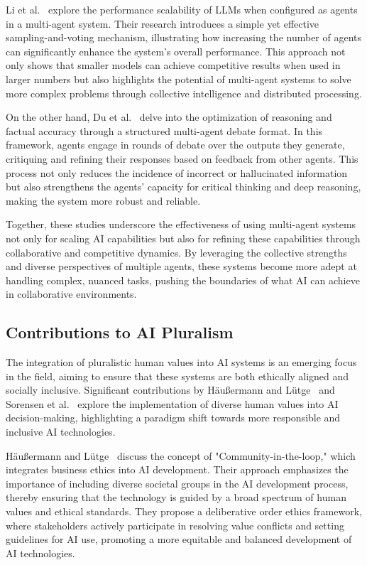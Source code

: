 Li et al.~\cite{li2024agents} explore the performance scalability of LLMs when configured as agents in a multi-agent system. Their research introduces a simple yet effective sampling-and-voting mechanism, illustrating how increasing the number of agents can significantly enhance the system's overall performance. This approach not only shows that smaller models can achieve competitive results when used in larger numbers but also highlights the potential of multi-agent systems to solve more complex problems through collective intelligence and distributed processing.

On the other hand, Du et al.~\cite{du2023improving} delve into the optimization of reasoning and factual accuracy through a structured multi-agent debate format. In this framework, agents engage in rounds of debate over the outputs they generate, critiquing and refining their responses based on feedback from other agents. This process not only reduces the incidence of incorrect or hallucinated information but also strengthens the agents' capacity for critical thinking and deep reasoning, making the system more robust and reliable.

Together, these studies underscore the effectiveness of using multi-agent systems not only for scaling AI capabilities but also for refining these capabilities through collaborative and competitive dynamics. By leveraging the collective strengths and diverse perspectives of multiple agents, these systems become more adept at handling complex, nuanced tasks, pushing the boundaries of what AI can achieve in collaborative environments.



\subsection{Contributions to AI Pluralism}
The integration of pluralistic human values into AI systems is an emerging focus in the field, aiming to ensure that these systems are both ethically aligned and socially inclusive. Significant contributions by Häußermann and Lütge~\cite{ChristophCommunityInloop2021} and Sorensen et al.~\cite{Sorensen_2024} explore the implementation of diverse human values into AI decision-making, highlighting a paradigm shift towards more responsible and inclusive AI technologies.

Häußermann and Lütge~\cite{ChristophCommunityInloop2021} discuss the concept of "Community-in-the-loop," which integrates business ethics into AI development. Their approach emphasizes the importance of including diverse societal groups in the AI development process, thereby ensuring that the technology is guided by a broad spectrum of human values and ethical standards. They propose a deliberative order ethics framework, where stakeholders actively participate in resolving value conflicts and setting guidelines for AI use, promoting a more equitable and balanced development of AI technologies.


